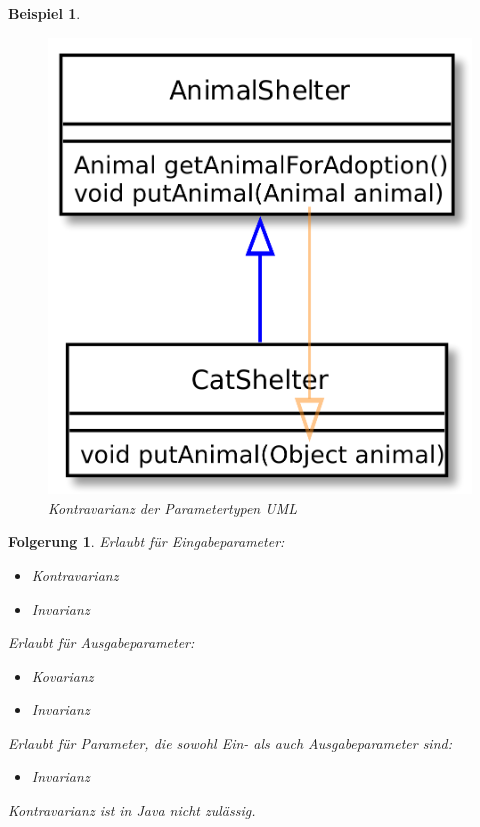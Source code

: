 \documentclass[a4paper]{article}
\theoremstyle{break}
\newtheorem{der}{Folgerung}[section]
\newtheorem{ex}{Beispiel}[section]
\begin{document}
\begin{ex}
	\begin{figure}[H]
		\centering
		\includegraphics[width=\textwidth]{../diagrams/uml/contravariance.png}
		\caption{Kontravarianz der Parametertypen UML}
	\end{figure}
\end{ex}

\begin{der}
	Erlaubt für Eingabeparameter:
	\begin{itemize}
		\item Kontravarianz
		\item Invarianz
	\end{itemize}
	Erlaubt für Ausgabeparameter:
	\begin{itemize}
		\item Kovarianz
		\item Invarianz
	\end{itemize}
	Erlaubt für Parameter, die sowohl Ein- als auch Ausgabeparameter sind:
	\begin{itemize}
		\item Invarianz
	\end{itemize}
	Kontravarianz ist in Java nicht zulässig.
\end{der}
\end{document}
